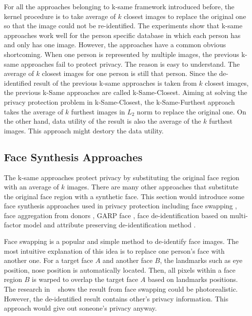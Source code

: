 	For all the approaches belonging to k-same framework introduced before, 
	the kernel procedure is to take average of $k$ closest images to replace 
	the original one so that the image could not be re-identified. The 
	experiments show that k-same approaches work well for the person specific
	database in which each person has and only has one image. However, 
	the approaches have a common obvious shortcoming. When one person is
	represented by multiple images, the previous k-same approaches fail to
	protect privacy. The reason is easy to understand. The average of $k$ closest 
	images for one person is still that person. Since the de-identified result of
	the previous k-same approaches is taken from $k$ closest images, the previous 
	k-Same approaches are called k-Same-Closest. Aiming at solving the privacy 
	protection problem in k-Same-Closest, the k-Same-Furthest approach
	\cite{Meng14Face,Sun15} takes the average of $k$ furthest images in $L_2$ norm
	to replace the original one. On the other hand, data utility of the result 
	is also the average of the $k$ furthest images. This approach might
	destory the data utility.

	\subsection{Face Synthesis Approaches}

	The k-same approaches protect privacy by substituting the original face region 
	with an average of $k$ images. There are many other approaches that substitute
	the original face region with a synthetic face. This section would introduce
	some face synthesis approaches used in privacy protection including face swapping 
	\cite{swap08}, face aggregation from donors \cite{Mosa14}, GARP face \cite{GARP14}, 
	face de-identification based on multi-factor model \cite{multifactor08} and 
	attribute preserving de-identification method \cite{Attribute15}. 

	Face swapping is a popular and simple method to de-identify face images. 
	The most intuitive explanation of this idea is to replace one person's face 
	with another one. For a target face $A$ and another face $B$, the landmarks 
	such as eye position, nose position is automatically located. Then, all 
	pixels within a face region $B$ is warped to overlap the target face $A$ 
	based on landmarks positions. The research in ~\cite{swap08} shows the 
	result from face swapping could be photorealistic. However, the de-identified 
	result contains other's privacy information. This approach would give out soneone's
	privacy anyway.

